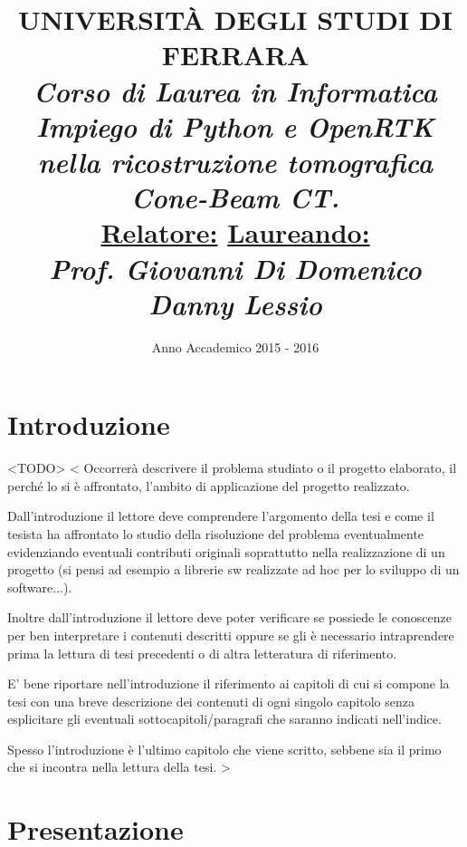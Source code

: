 \documentclass[a4paper,12pt, doubleside]{report}
\title{\textbf{UNIVERSITÀ DEGLI STUDI DI FERRARA\\}
\bigskip
\textit{Corso di Laurea in Informatica}\\
\bigskip
\bigskip
\bigskip
\bigskip
\bigskip
\bigskip
\bigskip
\bigskip
\bigskip
\bigskip
\bigskip
\bigskip
\bigskip
\bigskip
\bigskip
\bigskip
\textit{\textbf{Impiego di Python e OpenRTK nella ricostruzione tomografica Cone-Beam CT.\\}}
\bigskip
\bigskip
\bigskip
\bigskip
\bigskip
\bigskip
\bigskip
\bigskip
\bigskip
\bigskip
\bigskip
\bigskip
\bigskip
\bigskip
\bigskip
\bigskip
\bigskip
\bigskip
\bigskip
\bigskip
\bigskip
\textbf{\underline{Relatore:}}
\hfill
\textbf{\underline{Laureando:}\thinspace\thinspace\thinspace} \\
\textit{Prof. Giovanni Di Domenico}
\hfill
\textit{Danny Lessio}
\bigskip
\bigskip
\bigskip
\bigskip
\bigskip
\bigskip
\bigskip
\bigskip
\bigskip
}
\date{Anno Accademico 2015 - 2016}
\begin{document}
    \maketitle
    \newpage

    \chapter*{Introduzione}
        \par
            <TODO>
            <
        		Occorrerà descrivere il problema studiato o il progetto elaborato, il perché lo si è affrontato, l'ambito di applicazione del progetto realizzato.
        
        		Dall'introduzione il lettore deve comprendere l'argomento della tesi e come il tesista ha affrontato lo studio della risoluzione del problema eventualmente evidenziando eventuali contributi originali soprattutto nella realizzazione di un progetto (si pensi ad esempio a librerie sw realizzate ad hoc per lo sviluppo di un software...).
        
        		Inoltre dall'introduzione il lettore deve poter verificare se possiede le conoscenze per ben interpretare i contenuti descritti oppure se gli è necessario intraprendere prima la lettura di tesi precedenti o di altra letteratura di riferimento.
        
        		E' bene riportare nell'introduzione il riferimento ai capitoli di cui si compone la tesi con una breve descrizione dei contenuti di ogni singolo capitolo senza esplicitare gli eventuali sottocapitoli/paragrafi che saranno indicati nell'indice.
        
        		Spesso l'introduzione è l'ultimo capitolo che viene scritto, sebbene sia il primo che si incontra nella lettura della tesi.
        	>
    
    \newpage
    \tableofcontents
    \newpage
    \chapter{Presentazione}
\end{document}

